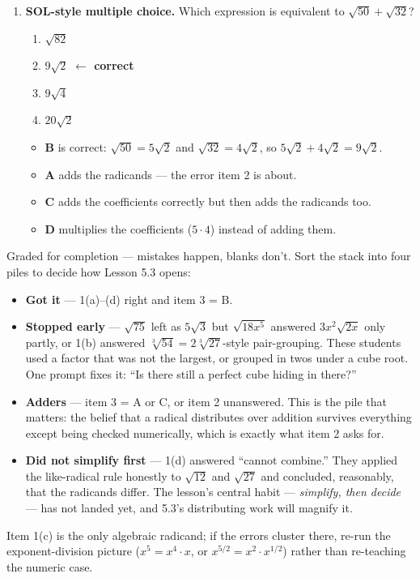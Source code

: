 \documentclass[10pt]{article}
\begin{document}
\begin{enumerate}[leftmargin=1.8em, itemsep=10pt]
  \item \textbf{SOL-style multiple choice.} Which expression is equivalent to
        $\sqrt{50}+\sqrt{32}$?
        \begin{enumerate}[label=\Alph*., leftmargin=1.9em, itemsep=1pt]
          \item $\sqrt{82}$
          \item $9\sqrt{2}$ \quad \textcolor{keyred}{\textbf{$\leftarrow$ correct}}
          \item $9\sqrt{4}$
          \item $20\sqrt{2}$
        \end{enumerate}
        \vspace{2pt}
        \begin{itemize}[leftmargin=1.4em, nosep]
          \item \textbf{B} is correct: $\sqrt{50}=5\sqrt2$ and $\sqrt{32}=4\sqrt2$, so $5\sqrt2+4\sqrt2=9\sqrt2$.
          \item \textbf{A} adds the radicands --- the error item 2 is about.
          \item \textbf{C} adds the coefficients correctly but then adds the radicands too.
          \item \textbf{D} multiplies the coefficients ($5\cdot4$) instead of adding them.
        \end{itemize}
\end{enumerate}

\begin{teachernote}
Graded for completion --- mistakes happen, blanks don't. Sort the stack into four piles to decide
how Lesson 5.3 opens:
\begin{itemize}[leftmargin=1.3em, nosep]
  \item \textbf{Got it} --- 1(a)--(d) right and item 3 = B.
  \item \textbf{Stopped early} --- $\sqrt{75}$ left as $5\sqrt3$ but $\sqrt{18x^5}$ answered
        $3x^2\sqrt{2x}$ only partly, or 1(b) answered $\sqrt[3]{54}=2\sqrt[3]{27}$-style
        pair-grouping. These students used a factor that was not the largest, or grouped in twos
        under a cube root. One prompt fixes it: ``Is there still a perfect cube hiding in there?''
  \item \textbf{Adders} --- item 3 = A or C, or item 2 unanswered. This is the pile that matters:
        the belief that a radical distributes over addition survives everything except being
        checked numerically, which is exactly what item 2 asks for.
  \item \textbf{Did not simplify first} --- 1(d) answered ``cannot combine.'' They applied the
        like-radical rule honestly to $\sqrt{12}$ and $\sqrt{27}$ and concluded, reasonably, that
        the radicands differ. The lesson's central habit --- \emph{simplify, then decide} --- has
        not landed yet, and 5.3's distributing work will magnify it.
\end{itemize}
Item 1(c) is the only algebraic radicand; if the errors cluster there, re-run the exponent-division
picture ($x^5=x^4\cdot x$, or $x^{5/2}=x^2\cdot x^{1/2}$) rather than re-teaching the numeric case.
\end{teachernote}
\end{document}
